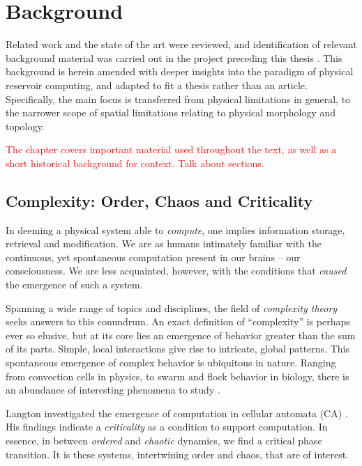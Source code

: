 \chapter{Background}

Related work and the state of the art were reviewed, and identification of
relevant background material was carried out in the project preceding this
thesis \cite{aven_exploring_2019}. This background is herein amended with deeper
insights into the paradigm of physical reservoir computing, and adapted to fit a
thesis rather than an article. Specifically, the main focus is transferred from
physical limitations in general, to the narrower scope of spatial limitations
relating to physical morphology and topology.

\textcolor{red}{
  The chapter covers important material used throughout the text, as well as a
short historical background for context. Talk about sections.
}

\section{Complexity: Order, Chaos and Criticality}

In deeming a physical system able to \textit{compute}, one implies information
storage, retrieval and modification. We are as humans intimately familiar with
the continuous, yet spontaneous computation present in our brains -- our
consciousness. We are less acquainted, however, with the conditions that
\textit{caused} the emergence of such a system.

Spanning a wide range of topics and disciplines, the field of \textit{complexity
theory} seeks answers to this conundrum. An exact definition of ``complexity''
is perhaps ever so elusive, but at its core lies an emergence of behavior
greater than the sum of its parts. Simple, local interactions give rise to
intricate, global patterns. This spontaneous emergence of complex behavior is
ubiquitous in nature. Ranging from convection cells in physics, to swarm and
flock behavior in biology, there is an abundance of interesting phenomena to
study \cite{heylighen_science_1999-1}.

Langton investigated the emergence of computation in cellular automata (CA)
\cite{langton_computation_1990}. His findings indicate a \textit{criticality} as
a condition to support computation. In essence, in between \textit{ordered} and
\textit{chaotic} dynamics, we find a critical phase transition. It is these
systems, intertwining order and chaos, that are of interest.

